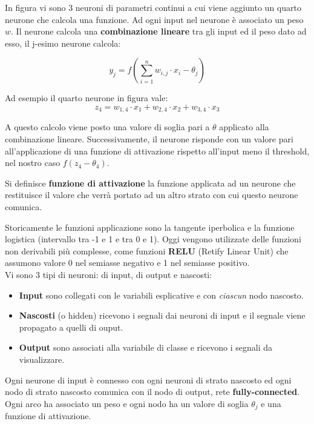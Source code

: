 In figura vi sono 3 neuroni di parametri continui a cui viene aggiunto un quarto neurone che calcola una funzione. Ad ogni input nel neurone è associato un peso $w$.
Il neurone calcola una \textbf{combinazione lineare} tra gli input ed il peso dato ad esso, il j-esimo neurone calcola: 

\[ y_j = f(\sum_{i=1}^{n} w_{i,j} \cdot x_i - \theta_j)\] 

Ad esempio il quarto neurone in figura vale:  
\[z_4 = w_{1,4} \cdot x_1 + w_{2,4} \cdot x_2 +w_{3,4} \cdot x_3\]

A questo calcolo viene posto una valore di soglia pari a $\theta$ applicato alla combinazione lineare. Successivamente,  il neurone risponde con un valore pari all'applicazione di una funzione di attivazione rispetto all'input meno il threshold, nel nostro caso $f(z_4-\theta_4)$. 

\begin{defn}
	Si definisce \textbf{funzione di attivazione} la funzione applicata ad un neurone che restituisce il valore che verrà portato ad un altro strato con cui questo neurone comunica.
\end{defn}
Storicamente le funzioni applicazione sono la tangente iperbolica e la funzione logistica (intervallo tra -1 e 1 e tra 0 e 1). Oggi vengono utilizzate delle funzioni non derivabili più complesse, come funzioni \textbf{RELU} (Retify Linear Unit) che assumono valore 0 nel semiasse negativo e 1 nel semiasse positivo.
\\

Vi sono 3 tipi di neuroni: di input, di output e nascosti:
\begin{itemize}
	\item \textbf{Input} sono collegati con le variabili esplicative e con \textit{ciascun} nodo nascosto.
	\item \textbf{Nascosti} (o hidden) ricevono i segnali dai neuroni di input e il segnale viene propagato a quelli di ouput.
	\item \textbf{Output} sono associati alla variabile di classe e ricevono i segnali da visualizzare.
\end{itemize}

Ogni neurone di input è connesso con ogni neuroni di strato nascosto  ed ogni nodo di strato nascosto comunica con il nodo di output, rete \textbf{fully-connected}. Ogni arco ha associato un peso e ogni nodo ha un valore di soglia $\theta_j$ e una funzione di attivazione. 

